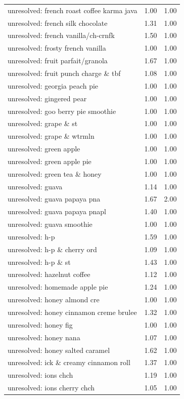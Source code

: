 \begin{table}
\begin{tabular}{lrr}
unresolved: french roast coffee karma java & 1.00 & 1.00 \\
unresolved: french silk chocolate & 1.31 & 1.00 \\
unresolved: french vanilla/ch-crnfk & 1.50 & 1.00 \\
unresolved: frosty french vanilla & 1.00 & 1.00 \\
unresolved: fruit parfait/granola & 1.67 & 1.00 \\
unresolved: fruit punch charge \& tbf & 1.08 & 1.00 \\
unresolved: georgia peach pie & 1.00 & 1.00 \\
unresolved: gingered pear & 1.00 & 1.00 \\
unresolved: goo berry pie smoothie & 1.00 & 1.00 \\
unresolved: grape \& st & 1.00 & 1.00 \\
unresolved: grape \& wtrmln & 1.00 & 1.00 \\
unresolved: green apple & 1.00 & 1.00 \\
unresolved: green apple pie & 1.00 & 1.00 \\
unresolved: green tea \& honey & 1.00 & 1.00 \\
unresolved: guava & 1.14 & 1.00 \\
unresolved: guava papaya pna & 1.67 & 2.00 \\
unresolved: guava papaya pnapl & 1.40 & 1.00 \\
unresolved: guava smoothie & 1.00 & 1.00 \\
unresolved: h-p & 1.59 & 1.00 \\
unresolved: h-p \& cherry ord & 1.09 & 1.00 \\
unresolved: h-p \& st & 1.43 & 1.00 \\
unresolved: hazelnut coffee & 1.12 & 1.00 \\
unresolved: homemade apple pie & 1.24 & 1.00 \\
unresolved: honey almond cre & 1.00 & 1.00 \\
unresolved: honey cinnamon creme brulee & 1.32 & 1.00 \\
unresolved: honey fig & 1.00 & 1.00 \\
unresolved: honey nana & 1.07 & 1.00 \\
unresolved: honey salted caramel & 1.62 & 1.00 \\
unresolved: ick \& creamy cinnamon roll & 1.37 & 1.00 \\
unresolved: ions chch & 1.19 & 1.00 \\
unresolved: ions cherry chch & 1.05 & 1.00 \\

\end{tabular}
\end{table}
